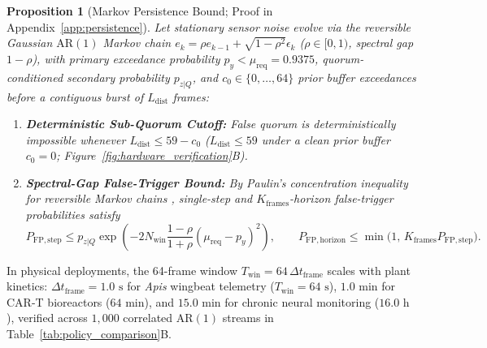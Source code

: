 \documentclass[11pt]{article}
\theoremstyle{plain}
\newtheorem{proposition}{Proposition}
\theoremstyle{remark}
\begin{document}
\begin{proposition}[Markov Persistence Bound; Proof in Appendix~\ref{app:persistence}]
\label{prop:persistence}
Let stationary sensor noise evolve via the reversible Gaussian $\mathrm{AR}(1)$ Markov chain $e_k = \rho e_{k-1} + \sqrt{1 - \rho^2}\epsilon_k$ ($\rho \in [0, 1)$, spectral gap $1 - \rho$), with primary exceedance probability $p_y < \mu_{\mathrm{req}} = 0.9375$, quorum-conditioned secondary probability $p_{z|Q}$, and $c_0 \in \{0,\dots,64\}$ prior buffer exceedances before a contiguous burst of $L_{\mathrm{dist}}$ frames:
\begin{enumerate}
  \item \textbf{Deterministic Sub-Quorum Cutoff:} False quorum is deterministically impossible whenever $L_{\mathrm{dist}} \le 59 - c_0$ ($L_{\mathrm{dist}} \le 59$ under a clean prior buffer $c_0 = 0$; Figure~\ref{fig:hardware_verification}B).
  \item \textbf{Spectral-Gap False-Trigger Bound:} By Paulin's concentration inequality for reversible Markov chains \cite{paulin2015concentration}, single-step and $K_{\mathrm{frames}}$-horizon false-trigger probabilities satisfy
  \begin{equation}
    P_{\mathrm{FP,step}} \le p_{z|Q}\exp\!\left(-2 N_{\mathrm{win}}\frac{1-\rho}{1+\rho}(\mu_{\mathrm{req}} - p_y)^2\right), \qquad P_{\mathrm{FP,horizon}} \le \min\!\big(1,\, K_{\mathrm{frames}} P_{\mathrm{FP,step}}\big).
    \label{eq:paulin_step}
  \end{equation}
\end{enumerate}
\end{proposition}

In physical deployments, the 64-frame window $T_{\mathrm{win}} = 64\,\Delta t_{\mathrm{frame}}$ scales with plant kinetics: $\Delta t_{\mathrm{frame}} = 1.0\text{ s}$ for \textit{Apis} wingbeat telemetry ($T_{\mathrm{win}} = 64\text{ s}$), $1.0\text{ min}$ for CAR-T bioreactors ($64\text{ min}$), and $15.0\text{ min}$ for chronic neural monitoring ($16.0\text{ h}$), verified across $1{,}000$ correlated $\mathrm{AR}(1)$ streams in Table~\ref{tab:policy_comparison}B.
\end{document}
